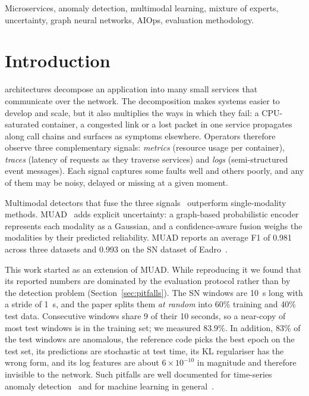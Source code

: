 \documentclass[journal]{IEEEtran}
\begin{document}
\begin{IEEEkeywords}
Microservices, anomaly detection, multimodal learning, mixture of experts, uncertainty, graph neural
networks, AIOps, evaluation methodology.
\end{IEEEkeywords}

\section{Introduction}
\label{sec:intro}

 architectures decompose an application into many small services that
communicate over the network. The decomposition makes systems easier to develop and scale, but it also
multiplies the ways in which they fail: a CPU-saturated container, a congested link or a lost packet in one
service propagates along call chains and surfaces as symptoms elsewhere. Operators therefore observe three
complementary signals: \emph{metrics} (resource usage per container), \emph{traces} (latency of requests as
they traverse services) and \emph{logs} (semi-structured event messages). Each signal captures some faults
well and others poorly, and any of them may be noisy, delayed or missing at a given moment.

Multimodal detectors that fuse the three signals~\cite{zhao2021scwarn,lee2023hades,lee2023eadro,zhao2023anofusion,huang2023mstgad}
outperform single-modality methods. MUAD~\cite{dou2026muad} adds explicit uncertainty: a graph-based
probabilistic encoder represents each modality as a Gaussian, and a confidence-aware fusion weighs the
modalities by their predicted reliability. MUAD reports an average F1 of 0.981 across three datasets and
0.993 on the SN dataset of Eadro~\cite{lee2023eadro}.

This work started as an extension of MUAD. While reproducing it we found that its reported numbers are
dominated by the evaluation protocol rather than by the detection problem (Section~\ref{sec:pitfalls}).
The SN windows are 10~s long with a stride of 1~s, and the paper splits them \emph{at random} into 60\%
training and 40\% test data. Consecutive windows share 9 of their 10 seconds, so a near-copy of most test
windows is in the training set; we measured 83.9\%. In addition, 83\% of the test windows are anomalous,
the reference code picks the best epoch on the test set, its predictions are stochastic at test time, its
KL regulariser has the wrong form, and its log features are about $6\times10^{-10}$ in magnitude and
therefore invisible to the network. Such pitfalls are well documented for time-series anomaly
detection~\cite{wu2023flawed,kim2022rigorous} and for machine learning in general~\cite{kaufman2012leakage,kapoor2023leakage}.
\end{document}
